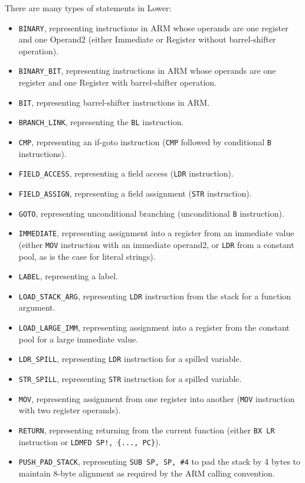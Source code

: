 \documentclass[nonacm, acmsmall, screen, 10pt]{acmart}
\begin{document}
There are many types of statements in Lower:
\begin{itemize}
  \item \texttt{BINARY}, representing instructions in ARM whose operands are one register and one Operand2 (either Immediate or Register without barrel-shifter operation).
  \item \texttt{BINARY\_BIT}, representing instructions in ARM whose operands are one register and one Register with barrel-shifter operation.
  \item \texttt{BIT}, representing barrel-shifter instructions in ARM.
  \item \texttt{BRANCH\_LINK}, representing the \texttt{BL} instruction.
  \item \texttt{CMP}, representing an if-goto instruction (\texttt{CMP} followed by conditional \texttt{B} instructions).
  \item \texttt{FIELD\_ACCESS}, representing a field access (\texttt{LDR} instruction).
  \item \texttt{FIELD\_ASSIGN}, representing a field assignment (\texttt{STR} instruction).
  \item \texttt{GOTO}, representing unconditional branching (unconditional \texttt{B} instruction).
  \item \texttt{IMMEDIATE}, representing assignment into a register from an immediate value (either \texttt{MOV} instruction with an immediate operand2, or \texttt{LDR} from a constant pool, as is the case for literal strings).
  \item \texttt{LABEL}, representing a label.
  \item \texttt{LOAD\_STACK\_ARG}, representing \texttt{LDR} instruction from the stack for a function argument.
  \item \texttt{LOAD\_LARGE\_IMM}, representing assignment into a register from the constant pool for a large immediate value.
  \item \texttt{LDR\_SPILL}, representing \texttt{LDR} instruction for a spilled variable.
  \item \texttt{STR\_SPILL}, representing \texttt{STR} instruction for a spilled variable.
  \item \texttt{MOV}, representing assignment from one register into another (\texttt{MOV} instruction with two register operands).
  \item \texttt{RETURN}, representing returning from the current function (either \texttt{BX LR} instruction or \texttt{LDMFD SP!, \{..., PC\}}).
  \item \texttt{PUSH\_PAD\_STACK}, representing \texttt{SUB SP, SP, \#4} to pad the stack by 4 bytes to maintain 8-byte alignment as required by the ARM calling convention.

\end{itemize}
\end{document}
